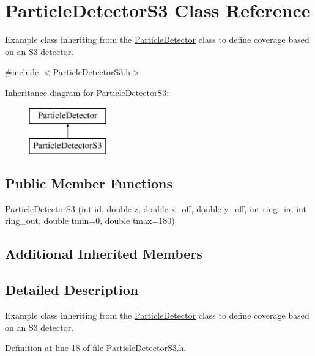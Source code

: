 \hypertarget{classParticleDetectorS3}{\section{Particle\-Detector\-S3 Class Reference}
\label{classParticleDetectorS3}
}


Example class inheriting from the \hyperlink{classParticleDetector}{Particle\-Detector} class to define coverage based on an S3 detector.  




{\ttfamily \#include $<$Particle\-Detector\-S3.\-h$>$}

Inheritance diagram for Particle\-Detector\-S3\-:\begin{figure}[H]
\begin{center}
\leavevmode
\includegraphics[height=2.000000cm]{classParticleDetectorS3}
\end{center}
\end{figure}
\subsection*{Public Member Functions}
\begin{DoxyCompactItemize}
\item 
\hyperlink{classParticleDetectorS3_a002873e132856865a40151e976974ad6}{Particle\-Detector\-S3} (int id, double z, double x\-\_\-off, double y\-\_\-off, int ring\-\_\-in, int ring\-\_\-out, double tmin=0, double tmax=180)
\end{DoxyCompactItemize}
\subsection*{Additional Inherited Members}


\subsection{Detailed Description}
Example class inheriting from the \hyperlink{classParticleDetector}{Particle\-Detector} class to define coverage based on an S3 detector. 

Definition at line 18 of file Particle\-Detector\-S3.\-h.



